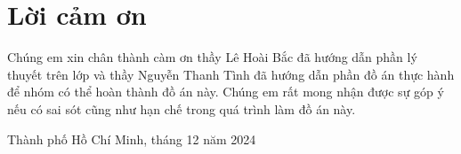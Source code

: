 \section*{Lời cảm ơn}
Chúng em xin chân thành càm ơn thầy Lê Hoài Bắc đã hướng dẫn phần lý thuyết trên lớp và thầy Nguyễn Thanh Tình đã hướng dẫn phần đồ án thực hành để nhóm có thể hoàn thành đồ án này. Chúng em rất mong nhận được sự góp ý nếu có sai sót cũng như hạn chế trong quá trình làm đồ án này.


\begin{flushright}
Thành phố Hồ Chí Minh, tháng 12 năm 2024
\end{flushright}